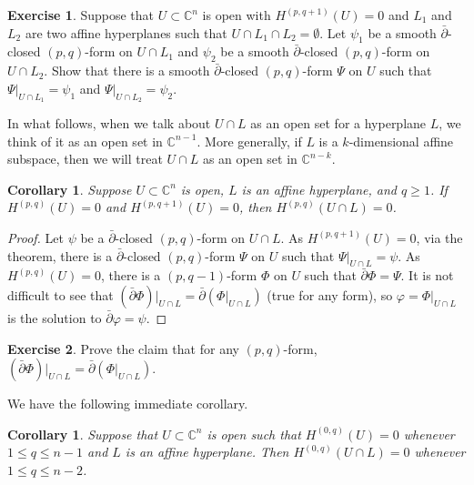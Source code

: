 \documentclass[12pt,openany]{book}
\newcommand{\C}{{\mathbb{C}}}
\theoremstyle{plain}
\newtheorem{cor}[thm]{Corollary}
\theoremstyle{remark}
\theoremstyle{definition}
\newenvironment{exbox}{%
    \def\FrameCommand{\vrule width 1pt \relax\hspace{10pt}}%
    \MakeFramed{\advance\hsize-\width\FrameRestore}%
}{%
    \endMakeFramed
}
\theoremstyle{exercise}
\newtheorem{exercise}{Exercise}[section]
\theoremstyle{example}
\begin{document}
\begin{exbox}
\begin{exercise}
Suppose that $U \subset \C^n$ is open with $H^{(p,q+1)}(U) = 0$ and
$L_1$ and $L_2$ are two affine hyperplanes such that $U \cap L_1 \cap L_2 =
\emptyset$.
Let $\psi_1$ be a smooth $\bar{\partial}$-closed $(p,q)$-form on
$U \cap L_1$
and $\psi_2$ be a smooth $\bar{\partial}$-closed $(p,q)$-form on
$U \cap L_2$.  Show that there is a smooth
$\bar{\partial}$-closed $(p,q)$-form
$\Psi$ on $U$ such that
$\Psi|_{U \cap L_1} = \psi_1$
and
$\Psi|_{U \cap L_2} = \psi_2$.
\end{exercise}
\end{exbox}

In what follows, when we talk about $U \cap L$ as an open set for a hyperplane
$L$, we think of it as an open set in $\C^{n-1}$.  More generally, if $L$
is a $k$-dimensional affine subspace, then we will treat $U \cap L$
as an open set in $\C^{n-k}$.

\begin{cor}
Suppose $U \subset \C^n$ is open, $L$ is an affine hyperplane, and $q \geq 1$.
If $H^{(p,q)}(U) = 0$ and
$H^{(p,q+1)}(U) = 0$, then $H^{(p,q)}(U \cap L) = 0$.
\end{cor}

\begin{proof}
Let $\psi$ be a $\bar{\partial}$-closed $(p,q)$-form on $U \cap L$.
As $H^{(p,q+1)}(U) = 0$, via the theorem,
there is a $\bar{\partial}$-closed $(p,q)$-form
$\Psi$ on $U$ such that
$\Psi|_{U \cap L} = \psi$.
As $H^{(p,q)}(U) = 0$, there is a $(p,q-1)$-form $\Phi$ on $U$
such that $\bar{\partial} \Phi = \Psi$.  It is not difficult to see that
$(\bar{\partial}\Phi)|_{U \cap L} = \bar{\partial}(\Phi|_{U \cap L})$ (true for any form),
so $\varphi = \Phi|_{U \cap L}$ is the solution to $\bar{\partial} \varphi = \psi$.
\end{proof}

\begin{exbox}
\begin{exercise}
Prove the claim that
for any $(p,q)$-form, $(\bar{\partial}\Phi)|_{U \cap L} =
\bar{\partial}(\Phi|_{U \cap L})$.
\end{exercise}
\end{exbox}

We have the following immediate corollary.

\begin{cor} \label{cor:dolgodown}
Suppose that $U \subset \C^n$ is open
such that $H^{(0,q)}(U) = 0$ whenever $1 \leq q \leq n-1$
and $L$ is an affine hyperplane.
Then $H^{(0,q)}(U \cap L) = 0$ whenever $1 \leq q \leq n-2$.
\end{cor}
\end{document}
